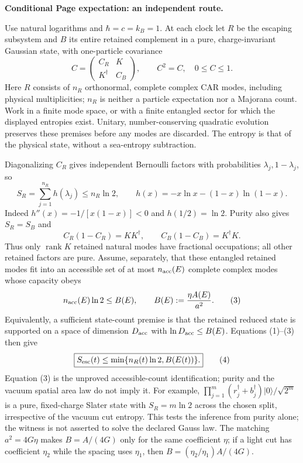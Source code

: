 \documentclass[11pt]{article}
\begin{document}
\noindent\textbf{Conditional Page expectation: an independent route.}

Use natural logarithms and $\hbar=c=k_B=1$. At each clock let $R$
be the escaping subsystem and $B$ its entire retained complement in a
pure, charge-invariant Gaussian state, with one-particle covariance
\[
 C=\begin{pmatrix}C_R&K\\K^\dagger&C_B\end{pmatrix},\qquad
 C^2=C,\quad 0\leq C\leq1.
\]
Here $R$ consists of $n_R$ orthonormal, complete complex CAR modes,
including physical multiplicities; $n_R$ is neither a particle expectation
nor a Majorana count. Work in a finite mode space, or with a finite
entangled sector for which the displayed entropies exist. Unitary,
number-conserving quadratic evolution preserves these premises before
any modes are discarded.
The entropy is that of the physical state, without a sea-entropy subtraction.

Diagonalizing $C_R$ gives independent Bernoulli factors with probabilities
$\lambda_j,1-\lambda_j$, so
\[
 S_R=\sum_{j=1}^{n_R}h(\lambda_j)\leq n_R\ln2,
 \qquad h(x)=-x\ln x-(1-x)\ln(1-x).
 \tag{1}
\]
Indeed $h''(x)=-1/[x(1-x)]<0$ and $h(1/2)=\ln2$. Purity also gives
$S_R=S_B$ and
\[
 C_R(1-C_R)=KK^\dagger,\qquad
 C_B(1-C_B)=K^\dagger K.
 \tag{2}
\]
Thus only $\operatorname{rank}K$ retained natural modes have fractional
occupations; all other retained factors are pure. Assume, separately,
that these entangled retained modes fit into an accessible set of at most
$n_{\rm acc}(E)$ complete complex modes whose capacity obeys
\[
 n_{\rm acc}(E)\ln2\leq B(E),\qquad B(E):=\frac{\eta A(E)}{a^2}.
 \tag{3}
\]
Equivalently, a sufficient state-count premise is that the retained
reduced state is supported on a space of dimension $D_{\rm acc}$ with
$\ln D_{\rm acc}\leq B(E)$. Equations (1)--(3) then give
\[
 \boxed{S_{\rm esc}(t)\leq\min\{n_R(t)\ln2,B(E(t))\}.} \tag{4}
\]
Equation (3) is the unproved accessible-count identification; purity and
the vacuum spatial area law do not imply it. For example,
$\prod_{j=1}^{m}(r_j^\dagger+b_j^\dagger)|0\rangle/\sqrt{2^m}$
is a pure, fixed-charge Slater state with $S_R=m\ln2$ across the chosen
split, irrespective of the vacuum cut entropy. This tests the inference
from purity alone; the witness is not asserted to solve the declared
Gauss law. The matching
$a^2=4G\eta$ makes $B=A/(4G)$ only for the same coefficient $\eta$;
if a light cut has coefficient $\eta_2$ while the spacing uses $\eta_1$,
then $B=(\eta_2/\eta_1)A/(4G)$.
\end{document}
